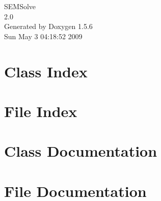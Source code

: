 \documentclass[a4paper]{book}
\begin{document}
\begin{titlepage}
\vspace*{7cm}
\begin{center}
{\Large SEMSolve \\[1ex]\large 2.0 }\\
\vspace*{1cm}
{\large Generated by Doxygen 1.5.6}\\
\vspace*{0.5cm}
{\small Sun May 3 04:18:52 2009}\\
\end{center}
\end{titlepage}
\clearemptydoublepage
{}
\tableofcontents
\clearemptydoublepage
{}
\chapter{Class Index}

\chapter{File Index}

\chapter{Class Documentation}

\chapter{File Documentation}




\printindex
\end{document}
